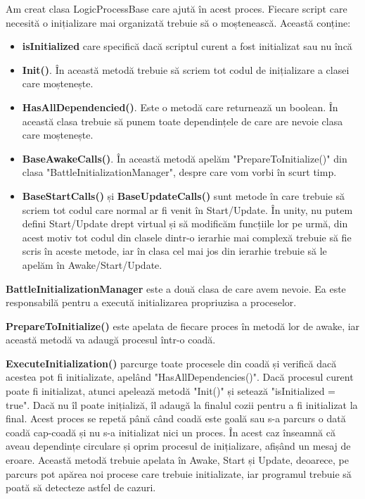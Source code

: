 \documentclass[12pt, a4paper]{article}
\begin{document}
	Am creat clasa LogicProcessBase care ajută în acest proces. Fiecare script care necesită o inițializare mai organizată trebuie să o moștenească. Această conține:
	\begin{itemize}
		\item \textbf{isInitialized} care specifică dacă scriptul curent a fost initializat sau nu încă
		\item \textbf{Init()}. În această metodă trebuie să scriem tot codul de inițializare a clasei care moștenește.
		\item \textbf{HasAllDependencied()}. Este o metodă care returnează un boolean. În această clasa trebuie să punem toate dependințele de care are nevoie clasa care moștenește.
		\item \textbf{BaseAwakeCalls()}. În această metodă apelăm "PrepareToInitialize()" din clasa "BattleInitializationManager", despre care vom vorbi în scurt timp.
		\item \textbf{BaseStartCalls()} și \textbf{BaseUpdateCalls()} sunt metode în care trebuie să scriem tot codul care normal ar fi venit în Start/Update. În unity, nu putem defini Start/Update drept virtual și să modificăm funcțiile lor pe urmă, din acest motiv tot codul din clasele dintr-o ierarhie mai complexă trebuie să fie scris în aceste metode, iar în clasa cel mai jos din ierarhie trebuie să le apelăm în Awake/Start/Update.
	\end{itemize}
	
	\textbf{BattleInitializationManager} este a două clasa de care avem nevoie. Ea este responsabilă pentru a execută initializarea propriuzisa a proceselor. 
	\newline
	
	\textbf{PrepareToInitialize()} este apelata de fiecare proces în metodă lor de awake, iar această metodă va adaugă procesul într-o coadă.
	\newline
	
	\textbf{ExecuteInitialization()} parcurge toate procesele din coadă și verifică dacă acestea pot fi initializate, apelând "HasAllDependencies()". Dacă procesul curent poate fi initializat, atunci apelează metodă "Init()" și setează "isInitialized = true". Dacă nu îl poate inițializă, îl adaugă la finalul cozii pentru a fi initializat la final. Acest proces se repetă până când coadă este goală sau s-a parcurs o dată coadă cap-coadă și nu s-a initializat nici un proces. În acest caz înseamnă că aveau dependințe circulare și oprim procesul de inițializare, afișând un mesaj de eroare. Această metodă trebuie apelata în Awake, Start și Update, deoarece, pe parcurs pot apărea noi procese care trebuie initializate, iar programul trebuie să poată să detecteze astfel de cazuri.
	
\end{document}
